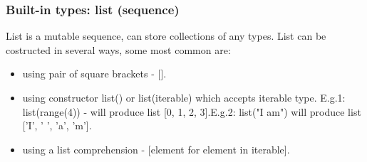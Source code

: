 \documentclass{article}
\begin{document}
	
	\subsubsection{Built-in types: list (sequence)}
	List is a mutable sequence, can store collections of any types. List can be costructed in several ways, some most common are:
	\begin{itemize}
	\item using pair of square brackets - [].
	\item \raggedright using constructor list() or list(iterable) which accepts iterable type. \linebreak E.g.1: list(range(4)) - will produce list [0, 1, 2, 3].\linebreak E.g.2: list("I am") will produce list ['I', ' ', 'a', 'm'].
	\item using a list comprehension - [element for element in iterable].
	\end{itemize}
	
\end{document}
